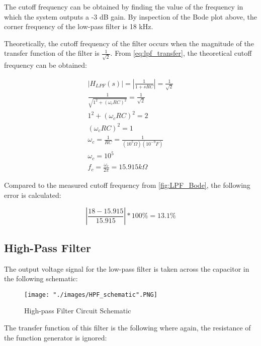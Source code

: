 \documentclass{article}
\begin{document}
	\FloatBarrier
	
	The cutoff frequency can be obtained by finding the value of the frequency in which the system outputs a -3 dB gain. By inspection of the Bode plot above, the corner frequency of the low-pass filter is 18 kHz.
	
	Theoretically, the cutoff frequency of the filter occurs when the magnitude of the transfer function of the filter is $\frac{1}{\sqrt{2}}$. From \ref{eq:lpf_transfer}, the theoretical cutoff frequency can be obtained:
	
	\begin{equation}
	\label{eq:lpf_cutoff}
	\begin{gathered}
	|H_{LPF}(s)| = |\frac{1}{1+sRC}| = \frac{1}{\sqrt{2}}\\
	\frac{1}{\sqrt{1^2 + (\omega_{c} RC)^2}} = \frac{1}{\sqrt{2}}\\
	1^2 + (\omega_{c} RC)^2 = 2\\
	(\omega_{c} RC)^2 = 1\\
	\omega_{c} = \frac{1}{RC} = \frac{1}{(10^5 \Omega)(10^{-9} F)}\\
	\omega_{c} = 10^5\\
	f_{c}  = \frac{\omega_{c}}{2\pi} = 15.915 k\Omega
	\end{gathered}
	\end{equation}
	
	Compared to the measured cutoff frequency from \ref{fig:LPF_Bode}, the following error is calculated:
	
	\begin{equation}
	\label{eq:lpf_cutoff_error}
	|\frac{18 - 15.915}{15.915}| * 100\% = 13.1\%
	\end{equation}
	
	
	\subsection{High-Pass Filter}
	
	The output voltage signal for the low-pass filter is taken across the capacitor in the following schematic:
	
	\begin{figure}[h!]
		\centering
		\texttt{[image: "./images/HPF\_schematic".PNG]}
		\caption{High-pass Filter Circuit Schematic}
		\label{fig:HPF_Schematic}
	\end{figure}
	
	The transfer function of this filter is the following where again, the resistance of the function generator is ignored:
	
\end{document}

